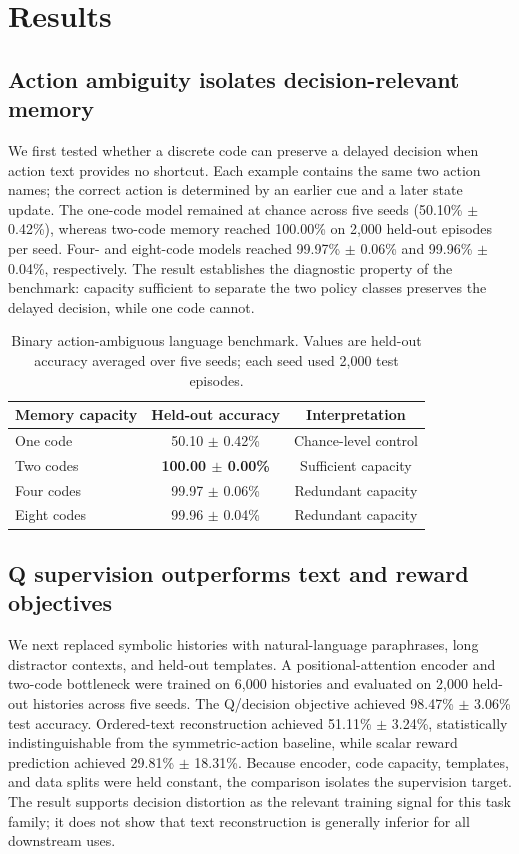 \documentclass[11pt]{article}
\begin{document}
\section{Results}
\subsection{Action ambiguity isolates decision-relevant memory}
We first tested whether a discrete code can preserve a delayed decision when action text provides no shortcut. Each example contains the same two action names; the correct action is determined by an earlier cue and a later state update. The one-code model remained at chance across five seeds (50.10\% $\pm$ 0.42\%), whereas two-code memory reached 100.00\% on 2,000 held-out episodes per seed. Four- and eight-code models reached 99.97\% $\pm$ 0.06\% and 99.96\% $\pm$ 0.04\%, respectively. The result establishes the diagnostic property of the benchmark: capacity sufficient to separate the two policy classes preserves the delayed decision, while one code cannot.

\begin{table}[t]
\centering
\caption{Binary action-ambiguous language benchmark. Values are held-out accuracy averaged over five seeds; each seed used 2,000 test episodes.}
\label{tab:binary}
\begin{tabular}{@{}lcc@{}}
\toprule
Memory capacity & Held-out accuracy & Interpretation\\
\midrule
One code & 50.10 $\pm$ 0.42\% & Chance-level control\\
Two codes & \textbf{100.00 $\pm$ 0.00\%} & Sufficient capacity\\
Four codes & 99.97 $\pm$ 0.06\% & Redundant capacity\\
Eight codes & 99.96 $\pm$ 0.04\% & Redundant capacity\\
\bottomrule
\end{tabular}
\end{table}

\subsection{Q supervision outperforms text and reward objectives}
We next replaced symbolic histories with natural-language paraphrases, long distractor contexts, and held-out templates. A positional-attention encoder and two-code bottleneck were trained on 6,000 histories and evaluated on 2,000 held-out histories across five seeds. The Q/decision objective achieved 98.47\% $\pm$ 3.06\% test accuracy. Ordered-text reconstruction achieved 51.11\% $\pm$ 3.24\%, statistically indistinguishable from the symmetric-action baseline, while scalar reward prediction achieved 29.81\% $\pm$ 18.31\%. Because encoder, code capacity, templates, and data splits were held constant, the comparison isolates the supervision target. The result supports decision distortion as the relevant training signal for this task family; it does not show that text reconstruction is generally inferior for all downstream uses.
\end{document}
